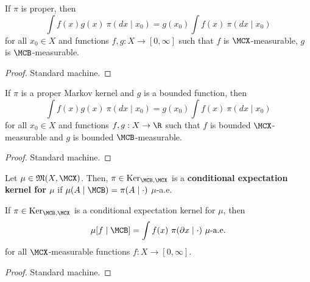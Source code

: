 \begin{lemma}
    \label{lem:proper-ker-lintegral}
    \leanok{}

    If $\pi$ is proper, then
    \[\int f(x) g(x)\ \pi(dx\mid x_0) = g(x_0)\int f(x)\ \pi(dx\mid x_0)\]
    for all $x_0 \in X$ and functions $f, g : X \to [0, \infty]$ such that $f$ is $\MCX$-measurable, $g$ is $\MCB$-measurable.
\end{lemma}
\begin{proof}
    \leanok{}

    Standard machine.
\end{proof}

\begin{lemma}
    \label{lem:proper-ker-integral}
    \leanok{}

    If $\pi$ is a proper Markov kernel and $g$ is a bounded function, then
    \[\int f(x) g(x)\ \pi(dx\mid x_0) = g(x_0)\int f(x)\ \pi(dx\mid x_0)\]
    for all $x_0 \in X$ and functions $f, g : X \to \R$ such that $f$ is bounded $\MCX$-measurable and $g$ is bounded $\MCB$-measurable.
\end{lemma}
\begin{proof}
    \leanok

    Standard machine.
\end{proof}

\begin{definition}
    \label{def:cond-exp-ker}
    \leanok{}

    Let $\mu\in\mathfrak{M}(X,\MCX)$. Then, $\pi\in\text{Ker}_{\MCB,\MCX}$ is a \textbf{conditional expectation kernel for $\mu$} if $\mu(A\mid \MCB)=\pi(A\mid\cdot)$ $\mu$-a.e.
\end{definition}

\begin{lemma}
    \label{lem:cond-exp-proper-ker-lintegral}

    If $\pi \in \text{Ker}_{\MCB, \MCX}$ is a conditional expectation kernel for $\mu$, then
    \[\mu[f\mid \MCB] = \int f(x)\ \pi(\partial x\mid\cdot)\ \mu\text{-a.e.}\]
    for all $\MCX$-measurable functions $f : X \to [0, \infty]$.
\end{lemma}
\begin{proof}

    Standard machine.
\end{proof}

